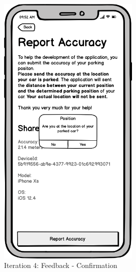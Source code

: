 \begin{figure}[H]
  \centering
  \begin{minipage}[b]{0.45\textwidth}
    \centering
    \includegraphics[width=0.6\textwidth]{images/UI/Iteration4-Feedback-Confirmation.png}
    \caption{Iteration 4: Feedback - Confirmation}
    \label{fig:i4-feedback-con}
  \end{minipage}
  \hfill
  \begin{minipage}[b]{0.45\textwidth}
    \centering

\end{minipage}
\end{figure}
